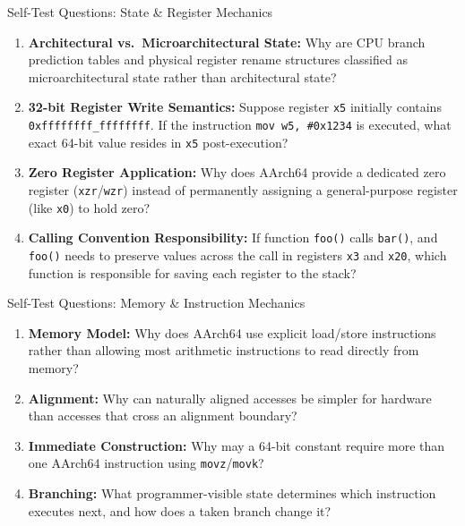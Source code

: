 \documentclass[aspectratio=169,11pt,t,xcolor=table]{beamer}
\newcommand{\key}[1]{\textbf{#1}}
\newcommand{\bits}[1]{\texttt{#1}}
\newcommand{\hex}[1]{\texttt{0x#1}}
\newcommand{\code}[1]{\texttt{#1}}
\begin{document}
\begin{frame}{Self-Test Questions: State \& Register Mechanics}
\vfill
\begin{enumerate}\setlength{\itemsep}{8pt}
  \item \key{Architectural vs.\ Microarchitectural State:} Why are CPU branch prediction tables and physical register rename structures classified as microarchitectural state rather than architectural state?

  \item \key{32-bit Register Write Semantics:} Suppose register \bits{x5} initially contains \hex{ffffffff\_ffffffff}. If the instruction \code{mov w5, \#0x1234} is executed, what exact 64-bit value resides in \bits{x5} post-execution?

  \item \key{Zero Register Application:} Why does AArch64 provide a dedicated zero register (\bits{xzr}/\bits{wzr}) instead of permanently assigning a general-purpose register (like \bits{x0}) to hold zero?

  \item \key{Calling Convention Responsibility:} If function \code{foo()} calls \code{bar()}, and \code{foo()} needs to preserve values across the call in registers \bits{x3} and \bits{x20}, which function is responsible for saving each register to the stack?
\end{enumerate}
\vfill
\end{frame}










\begin{frame}{Self-Test Questions: Memory \& Instruction Mechanics}
\vfill
\begin{enumerate}\setlength{\itemsep}{9pt}
  \item \key{Memory Model:} Why does AArch64 use explicit load/store instructions rather than allowing most arithmetic instructions to read directly from memory?

  \item \key{Alignment:} Why can naturally aligned accesses be simpler for hardware than accesses that cross an alignment boundary?

  \item \key{Immediate Construction:} Why may a 64-bit constant require more than one AArch64 instruction using \code{movz}/\code{movk}?

  \item \key{Branching:} What programmer-visible state determines which instruction executes next, and how does a taken branch change it?
\end{enumerate}
\vfill
\end{frame}
\end{document}
